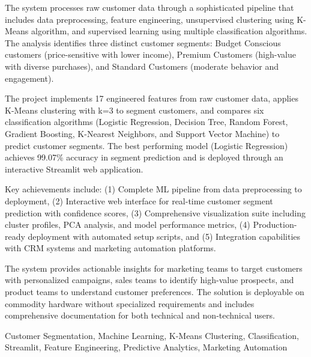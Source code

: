 \documentclass[12pt,a4paper]{report}
\begin{document}
\noindent
The system processes raw customer data through a sophisticated pipeline that includes data preprocessing, feature engineering, unsupervised clustering using K-Means algorithm, and supervised learning using multiple classification algorithms. The analysis identifies three distinct customer segments: Budget Conscious customers (price-sensitive with lower income), Premium Customers (high-value with diverse purchases), and Standard Customers (moderate behavior and engagement).

\noindent
The project implements 17 engineered features from raw customer data, applies K-Means clustering with k=3 to segment customers, and compares six classification algorithms (Logistic Regression, Decision Tree, Random Forest, Gradient Boosting, K-Nearest Neighbors, and Support Vector Machine) to predict customer segments. The best performing model (Logistic Regression) achieves 99.07\% accuracy in segment prediction and is deployed through an interactive Streamlit web application.

\noindent
Key achievements include: (1) Complete ML pipeline from data preprocessing to deployment, (2) Interactive web interface for real-time customer segment prediction with confidence scores, (3) Comprehensive visualization suite including cluster profiles, PCA analysis, and model performance metrics, (4) Production-ready deployment with automated setup scripts, and (5) Integration capabilities with CRM systems and marketing automation platforms.

\noindent
The system provides actionable insights for marketing teams to target customers with personalized campaigns, sales teams to identify high-value prospects, and product teams to understand customer preferences. The solution is deployable on commodity hardware without specialized requirements and includes comprehensive documentation for both technical and non-technical users.

\vspace{0.5cm}
 Customer Segmentation, Machine Learning, K-Means Clustering, Classification, Streamlit, Feature Engineering, Predictive Analytics, Marketing Automation

\newpage

\tableofcontents
\newpage

\listoffigures
\newpage
\end{document}
